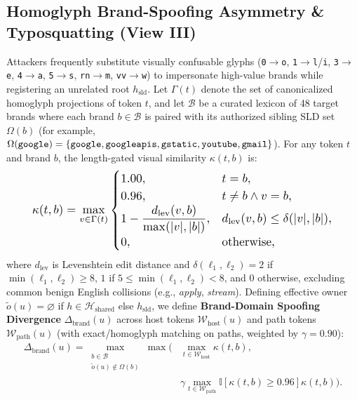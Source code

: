 \documentclass[conference]{IEEEtran}
\begin{document}
\subsection{Homoglyph Brand-Spoofing Asymmetry \& Typosquatting (View III)}
Attackers frequently substitute visually confusable glyphs (\texttt{0}$\to$\texttt{o}, \texttt{1}$\to$\texttt{l}/\texttt{i}, \texttt{3}$\to$\texttt{e}, \texttt{4}$\to$\texttt{a}, \texttt{5}$\to$\texttt{s}, \texttt{rn}$\to$\texttt{m}, \texttt{vv}$\to$\texttt{w}) to impersonate high-value brands while registering an unrelated root $h_{\text{sld}}$. Let $\Gamma(t)$ denote the set of canonicalized homoglyph projections of token $t$, and let $\mathcal{B}$ be a curated lexicon of 48 target brands where each brand $b \in \mathcal{B}$ is paired with its authorized sibling SLD set $\Omega(b)$ (for example, $\Omega(\text{\texttt{google}}) = \{\text{\texttt{google}},\allowbreak \text{\texttt{googleapis}},\allowbreak \text{\texttt{gstatic}},\allowbreak \text{\texttt{youtube}},\allowbreak \text{\texttt{gmail}}\}$). For any token $t$ and brand $b$, the length-gated visual similarity $\kappa(t, b)$ is:
\begin{equation}
\resizebox{0.89\columnwidth}{!}{$\displaystyle
\kappa(t, b) = \max_{v \in \Gamma(t)}
\begin{cases}
1.00, & t = b, \\
0.96, & t \neq b \land v = b, \\
1 - \dfrac{d_{\text{lev}}(v, b)}{\max(|v|, |b|)}, & d_{\text{lev}}(v,b) \le \delta(|v|,|b|), \\
0, & \text{otherwise},
\end{cases}$}
\label{eq:brandsim}
\end{equation}
where $d_{\text{lev}}$ is Levenshtein edit distance and $\delta(\ell_1,\ell_2) = 2$ if $\min(\ell_1,\ell_2) \ge 8$, $1$ if $5 \le \min(\ell_1,\ell_2) < 8$, and $0$ otherwise, excluding common benign English collisions (e.g., \emph{apply}, \emph{stream}). Defining effective owner $\tilde{o}(u) = \varnothing$ if $h \in \mathcal{H}_{\text{shared}}$ else $h_{\text{sld}}$, we define \textbf{Brand-Domain Spoofing Divergence} $\Delta_{\text{brand}}(u)$ across host tokens $\mathcal{W}_{\text{host}}(u)$ and path tokens $\mathcal{W}_{\text{path}}(u)$ (with exact/homoglyph matching on paths, weighted by $\gamma = 0.90$):
\begin{equation}
\begin{aligned}
\Delta_{\text{brand}}(u) = \!\max_{\substack{b \in \mathcal{B} \\ \tilde{o}(u) \notin \Omega(b)}}\! \max\Big(
  &\max_{t \in \mathcal{W}_{\text{host}}} \kappa(t,b), \\[-2pt]
  &\gamma \max_{t \in \mathcal{W}_{\text{path}}} \mathbb{I}[\kappa(t,b) \ge 0.96]\kappa(t,b) \Big).
\end{aligned}
\label{eq:spoof}
\end{equation}
\end{document}
